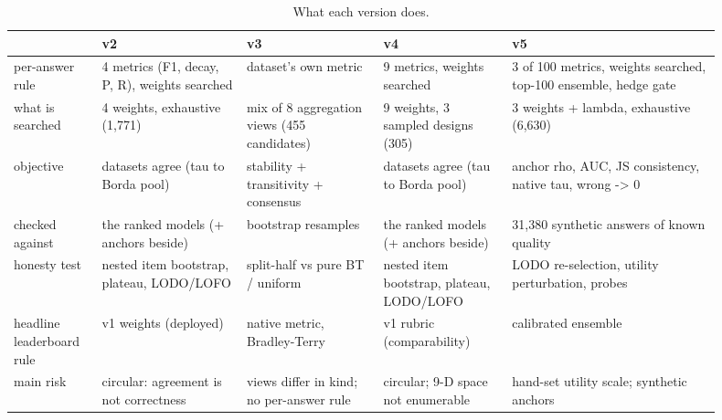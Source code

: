 \begin{table}[htbp]
\centering\scriptsize
\caption{What each version does.}
\label{tab:cmp_design}
\setlength{\tabcolsep}{3pt}
\begin{tabular}{p{0.103\linewidth}p{0.186\linewidth}p{0.178\linewidth}p{0.169\linewidth}p{0.264\linewidth}}
\toprule
 & v2 & v3 & v4 & v5 \\
\midrule
per-answer rule & 4 metrics (F1, decay, P, R), weights searched & dataset's own metric & 9 metrics, weights searched & 3 of 100 metrics, weights searched, top-100 ensemble, hedge gate \\
what is searched & 4 weights, exhaustive (1,771) & mix of 8 aggregation views (455 candidates) & 9 weights, 3 sampled designs (305) & 3 weights + lambda, exhaustive (6,630) \\
objective & datasets agree (tau to Borda pool) & stability + transitivity + consensus & datasets agree (tau to Borda pool) & anchor rho, AUC, JS consistency, native tau, wrong -> 0 \\
checked against & the ranked models (+ anchors beside) & bootstrap resamples & the ranked models (+ anchors beside) & 31,380 synthetic answers of known quality \\
honesty test & nested item bootstrap, plateau, LODO/LOFO & split-half vs pure BT / uniform & nested item bootstrap, plateau, LODO/LOFO & LODO re-selection, utility perturbation, probes \\
headline leaderboard rule & v1 weights (deployed) & native metric, Bradley-Terry & v1 rubric (comparability) & calibrated ensemble \\
main risk & circular: agreement is not correctness & views differ in kind; no per-answer rule & circular; 9-D space not enumerable & hand-set utility scale; synthetic anchors \\
\bottomrule
\end{tabular}
\end{table}
